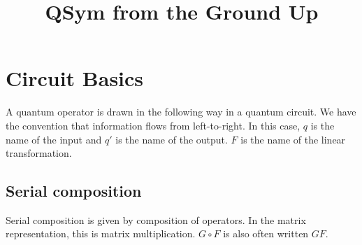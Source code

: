 \documentclass[runningheads]{llncs}
\begin{document}
\title{QSym from the Ground Up}
\author{}
\institute{}
\maketitle

\section{Circuit Basics}

A quantum operator is drawn in the following way in a quantum circuit. We have the convention that information flows from left-to-right. In this
case, $q$ is the name of the input and $q'$ is the name of the output. $F$ is the name of the linear transformation.

\begin{figure}[H]
  \centering
\begin{minipage}{.5\textwidth}
  \centering
\end{minipage}
\end{figure}

\subsection{Serial composition}

Serial composition is given by composition of operators. In the matrix representation, this is matrix multiplication. $G \circ F$ is also often written $GF$.
\end{document}
